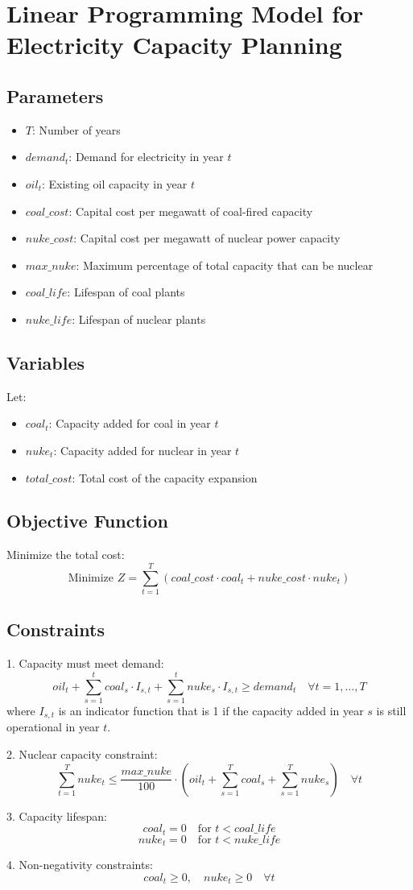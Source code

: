\documentclass{article}
\begin{document}
\section*{Linear Programming Model for Electricity Capacity Planning}

\subsection*{Parameters}
\begin{itemize}
    \item $T$: Number of years
    \item $demand_t$: Demand for electricity in year $t$
    \item $oil_t$: Existing oil capacity in year $t$
    \item $coal\_cost$: Capital cost per megawatt of coal-fired capacity
    \item $nuke\_cost$: Capital cost per megawatt of nuclear power capacity
    \item $max\_nuke$: Maximum percentage of total capacity that can be nuclear
    \item $coal\_life$: Lifespan of coal plants
    \item $nuke\_life$: Lifespan of nuclear plants
\end{itemize}

\subsection*{Variables}
Let:
\begin{itemize}
    \item $coal_t$: Capacity added for coal in year $t$
    \item $nuke_t$: Capacity added for nuclear in year $t$
    \item $total\_cost$: Total cost of the capacity expansion
\end{itemize}

\subsection*{Objective Function}
Minimize the total cost:
\[
\text{Minimize } Z = \sum_{t=1}^{T} (coal\_cost \cdot coal_t + nuke\_cost \cdot nuke_t)
\]

\subsection*{Constraints}
1. Capacity must meet demand:
\[
oil_t + \sum_{s=1}^{t} coal_s \cdot I_{s,t} + \sum_{s=1}^{t} nuke_s \cdot I_{s,t} \geq demand_t \quad \forall t = 1, \ldots, T
\]
where \(I_{s,t}\) is an indicator function that is 1 if the capacity added in year \(s\) is still operational in year \(t\).

2. Nuclear capacity constraint:
\[
\sum_{t=1}^{T} nuke_t \leq \frac{max\_nuke}{100} \cdot \left( oil_t + \sum_{s=1}^{T} coal_s + \sum_{s=1}^{T} nuke_s \right) \quad \forall t
\]

3. Capacity lifespan:
\[
coal_t = 0 \quad \text{for } t < coal\_life
\]
\[
nuke_t = 0 \quad \text{for } t < nuke\_life
\]

4. Non-negativity constraints:
\[
coal_t \geq 0, \quad nuke_t \geq 0 \quad \forall t
\]
\end{document}
